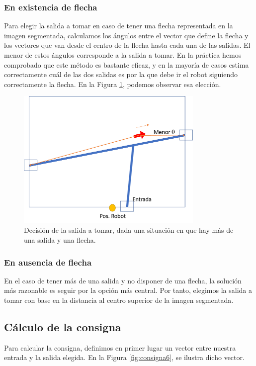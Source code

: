 \documentclass{article}
\begin{document}
        \subsubsection{En existencia de flecha} 
            Para elegir la salida a tomar en caso de tener una flecha representada en la imagen segmentada, calculamos los ángulos entre el vector que define la flecha y los vectores que van desde el centro de la flecha hasta cada una de las salidas. El menor de estos ángulos corresponde a la salida a tomar. En la práctica hemos comprobado que este método es bastante eficaz, y en la mayoría de casos estima correctamente cuál de las dos salidas es por la que debe ir el robot siguiendo correctamente la flecha. En la Figura \ref{fig:consigna5}, podemos observar esa elección.

            \begin{figure}[H]
                \centering
                \includegraphics[width=9cm]{figures/consigna5.png}
                \caption{Decisión de la salida a tomar, dada una situación en que hay más de una salida y una flecha.}
                \label{fig:consigna5}
            \end{figure}
        
        \subsubsection{En ausencia de flecha}
            En el caso de tener más de una salida y no disponer de una flecha, la solución más razonable es seguir por la opción más central. Por tanto, elegimos la salida a tomar con base en la distancia al centro superior de la imagen segmentada.

    \subsection{Cálculo de la consigna}
        Para calcular la consigna, definimos en primer lugar un vector entre nuestra entrada y la salida elegida. En la Figura \ref{fig:consigna6}, se ilustra dicho vector.
\end{document}
